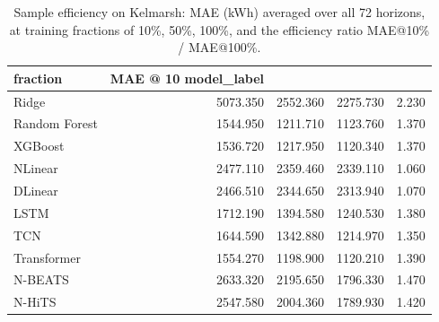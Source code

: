 \begin{table}[ht]
\caption{Sample efficiency on Kelmarsh: MAE (kWh) averaged over all 72 horizons, at training fractions of 10\%, 50\%, 100\%, and the efficiency ratio MAE@10\% / MAE@100\%.}
\label{tab:sample_efficiency}
\begin{tabular}{lrrrr}
\toprule
fraction & MAE @ 10%
model_label &  &  &  &  \\
\midrule
Ridge & 5073.350 & 2552.360 & 2275.730 & 2.230 \\
Random Forest & 1544.950 & 1211.710 & 1123.760 & 1.370 \\
XGBoost & 1536.720 & 1217.950 & 1120.340 & 1.370 \\
NLinear & 2477.110 & 2359.460 & 2339.110 & 1.060 \\
DLinear & 2466.510 & 2344.650 & 2313.940 & 1.070 \\
LSTM & 1712.190 & 1394.580 & 1240.530 & 1.380 \\
TCN & 1644.590 & 1342.880 & 1214.970 & 1.350 \\
Transformer & 1554.270 & 1198.900 & 1120.210 & 1.390 \\
N-BEATS & 2633.320 & 2195.650 & 1796.330 & 1.470 \\
N-HiTS & 2547.580 & 2004.360 & 1789.930 & 1.420 \\
\bottomrule
\end{tabular}
\end{table}
